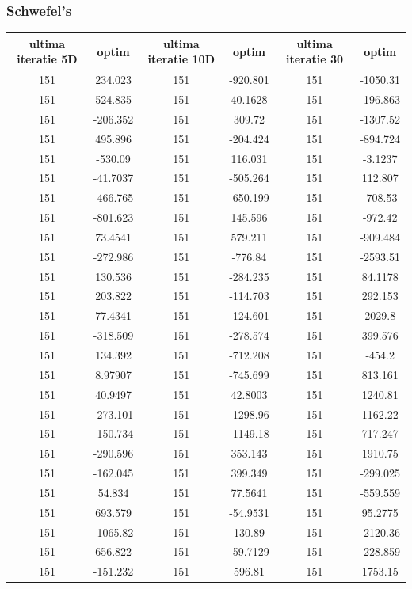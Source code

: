 \documentclass{article}
\begin{document}
\subsubsection{Schwefel’s}
\begin{tabular}{cccccc}
\hline
ultima iteratie 5D& optim&ultima iteratie 10D& optim&ultima iteratie 30&optim\\
\hline
151&234.023&151&-920.801&151&-1050.31 \\ \hline
151&524.835&151&40.1628&151&-196.863 \\ \hline
151&-206.352&151&309.72&151&-1307.52 \\ \hline
151&495.896&151&-204.424&151&-894.724 \\ \hline
151&-530.09&151&116.031&151&-3.1237 \\ \hline
151&-41.7037&151&-505.264&151&112.807 \\ \hline
151&-466.765&151&-650.199&151&-708.53 \\ \hline
151&-801.623&151&145.596&151&-972.42 \\ \hline
151&73.4541&151&579.211&151&-909.484 \\ \hline
151&-272.986&151&-776.84&151&-2593.51 \\ \hline
151&130.536&151&-284.235&151&84.1178 \\ \hline
151&203.822&151&-114.703&151&292.153 \\ \hline
151&77.4341&151&-124.601&151&2029.8 \\ \hline
151&-318.509&151&-278.574&151&399.576 \\ \hline
151&134.392&151&-712.208&151&-454.2 \\ \hline
151&8.97907&151&-745.699&151&813.161 \\ \hline
151&40.9497&151&42.8003&151&1240.81 \\ \hline
151&-273.101&151&-1298.96&151&1162.22 \\ \hline
151&-150.734&151&-1149.18&151&717.247 \\ \hline
151&-290.596&151&353.143&151&1910.75 \\ \hline
151&-162.045&151&399.349&151&-299.025 \\ \hline
151&54.834&151&77.5641&151&-559.559 \\ \hline
151&693.579&151&-54.9531&151&95.2775 \\ \hline
151&-1065.82&151&130.89&151&-2120.36 \\ \hline
151&656.822&151&-59.7129&151&-228.859 \\ \hline
151&-151.232&151&596.81&151&1753.15 \\ \hline

\end{tabular}
\end{document}
